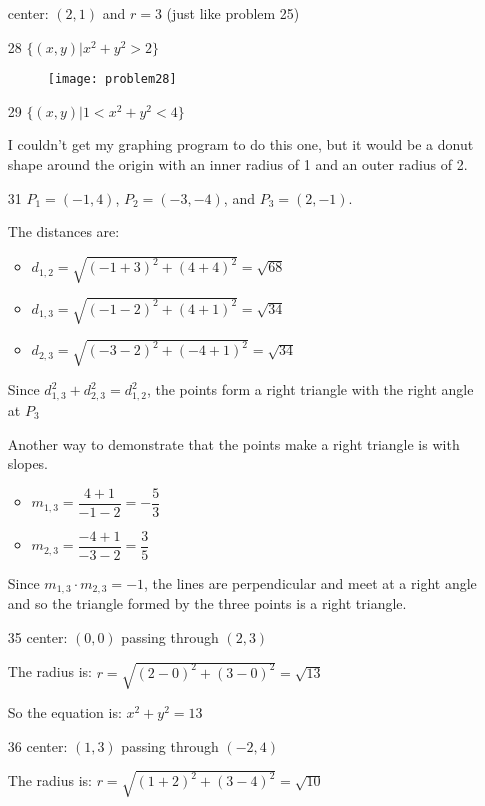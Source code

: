 \documentclass[fleqn,addpoints]{exam}
\begin{document}
\begin{itemize}
center: $(2, 1)$ and $r=3$ (just like problem 25)

\item[28]
$\{(x, y) | x^2 + y^2 > 2\}$

\begin{figure}[H]
  \texttt{[image: problem28]}
\end{figure}

\item[29]
$\{(x, y) | 1 < x^2 + y^2 < 4\}$

I couldn't get my graphing program to do this one, but it would be a donut shape around the origin with an inner radius
of 1 and an outer radius of 2.

\item[31]
$P_1 = (-1, 4)$, $P_2 = (-3, -4)$, and $P_3 = (2, -1)$.

The distances are:
\begin{itemize}
  \item $d_{1,2} = \sqrt{(-1+3)^2 + (4+4)^2} = \sqrt{68}$
  \item $d_{1,3} = \sqrt{(-1-2)^2 + (4+1)^2} = \sqrt{34}$
  \item $d_{2,3} = \sqrt{(-3-2)^2 + (-4+1)^2} = \sqrt{34}$
\end{itemize}

Since $d_{1,3}^2 + d_{2,3}^2 = d_{1,2}^2$, the points form a right triangle with the right angle at $P_3$

Another way to demonstrate that the points make a right triangle is with slopes.
\begin{itemize}
  \item $m_{1,3} = \dfrac{4+1}{-1-2} = -\dfrac{5}{3}$
  \item $m_{2,3} = \dfrac{-4+1}{-3-2} = \dfrac{3}{5}$
\end{itemize}

Since $m_{1,3} \cdot m_{2,3} = -1$, the lines are perpendicular and meet at a right angle and so the triangle formed by
the three points is a right triangle.

\item[35]
center: $(0, 0)$ passing through $(2, 3)$

The radius is: $r = \sqrt{(2 - 0)^2 + (3 - 0)^2} = \sqrt{13}$

So the equation is: $x^2+y^2 = 13$

\item[36]
center: $(1, 3)$ passing through $(-2, 4)$

The radius is: $r = \sqrt{(1+2)^2 + (3 - 4)^2} = \sqrt{10}$


\end{itemize}
\end{document}
